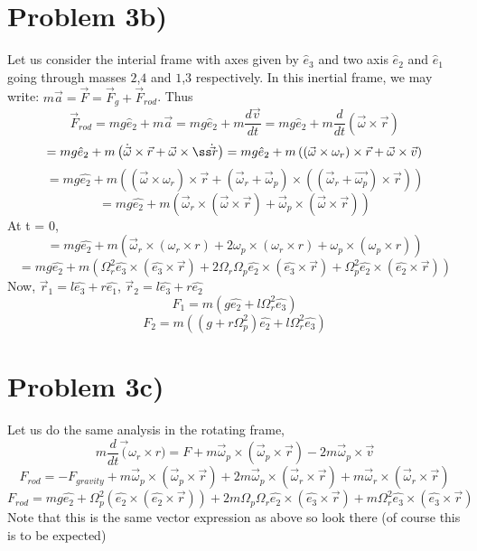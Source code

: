 \section*{Problem 3b)}
Let us consider the interial frame with axes given by $\hat e_3$ and two axis $\hat e_2$ and $\hat e_1$ going through masses $2$,$4$ and $1$,$3$ respectively. In this inertial frame, we may write:
$m\vec{a} = \vec{F} = \vec F_g + \vec F_{rod}$. Thus
\[ \vec F_{rod} = mg\hat e_2 + m\vec{a} = mg\hat e_2 + m \frac{d\vec{v}}{dt} = mg \hat e_2 + m \frac{d}{dt} (\vec \omega \times \vec r) \]
\[ =  mg\hat e_2 + m \left( \dot{\vec \omega} \times \vec r + \vec{\omega} \timesß \dot \vec{r} \right) = mg\hat e_2 + m \left( (\vec \omega\times \omega_r) \times \vec r + \vec{\omega} \times \vec{v} \right) \]
\[ =mg\hat{e_2} + m\left( (\vec \omega\times \omega_r) \times \vec{r} + (\vec \omega_r + \vec \omega_p)\times((\vec \omega_r + \vec{\omega_p}) \times \vec r)\right) \]
\[ = mg\hat{e_2} + m(\vec \omega_r \times (\vec \omega\times \vec r) + \vec \omega_p \times (\vec \omega \times \vec r)) \]
At t = 0,
\[ = mg\hat{e_2} + m(\vec \omega_r\times(\omega_r \times r) + 2\omega_p \times (\omega_r \times r) + \omega_p \times ( \omega_p \times r)) \]
\[ = mg\hat{e_2} + m(\Omega_r^2 \hat{e_3} \times (\hat{e_3} \times \vec r) + 2\Omega_r\Omega_p  \hat{e_2}\times(\hat{e_3}\times \vec r)+\Omega_p^2 \hat{e_2} \times (\hat{e_2} \times \vec r)) \]
Now, $\vec r_1 =  l\hat{e_3} + r\hat{e_1}$, $\vec r_2 =  l\hat{e_3} + r\hat{e_2}$
\[ F_1 = m(g \hat{e_2} + l\Omega_r^2\hat{e_3})\]
\[ F_2 = m((g + r\Omega_p^2)\hat{e_2} + l\Omega_r^2 \hat{e_3}) \]
\section*{Problem 3c)}
Let us do the same analysis in the rotating frame,
\[ m\frac{d}{dt} \vec (\omega_r\times r) = F + m\vec \omega_p\times(\vec \omega_p \times \vec r  ) - 2m\vec \omega_p \times \vec{v} \]
\[ F_{rod} = - F_{gravity} + m\vec \omega_p\times(\vec \omega_p \times \vec r  ) + 2m\vec \omega_p \times (\vec \omega_r\times \vec r) + m\vec\omega_r\times(\vec\omega_r\times\vec{r})\]
\[ F_{rod} = mg\hat{e_2} + \Omega_p^2 (\hat{e_2}\times(\hat{e_2}\times\vec r)) + 2 m \Omega_p\Omega_r \hat{e_2}\times(\hat{e_3}\times\vec r)+m\Omega_r^2 \hat{e_3}\times(\hat{e_3}\times \vec r) \]
Note that this is the same vector expression as above so look there (of course this is to be expected)
